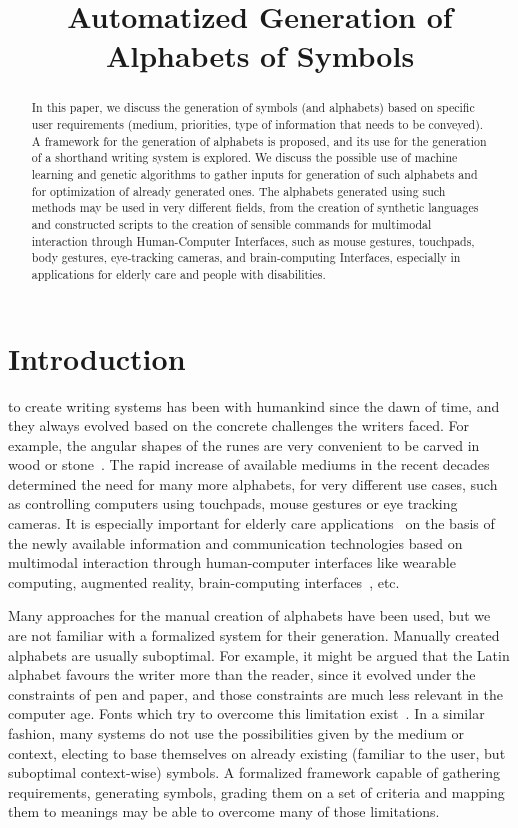 \documentclass[conference]{IEEEtran}
\title{Automatized Generation of Alphabets of Symbols}
\author{\IEEEauthorblockN{Serhii Hamotskyi\IEEEauthorrefmark{1}, Anis Rojbi\IEEEauthorrefmark{2}, Sergii Stirenko\IEEEauthorrefmark{1}, and Yuri Gordienko\IEEEauthorrefmark{1}}
\IEEEauthorblockA{\IEEEauthorrefmark{1}Igor Sikorsky Kyiv Polytechnic Institute, Kyiv, Ukraine, Email: shamotskyi@gmail.com}
\IEEEauthorblockA{\IEEEauthorrefmark{2}Laboratoire THIM (Technologies, Handicaps, Interfaces et Multimodalités), University Paris 8, Paris, France}
}
\begin{document}
\maketitle              %

\begin{abstract}
In this paper, we discuss the generation of symbols (and alphabets) based on specific user requirements (medium, priorities, type of information that needs to be conveyed). A framework for the generation of alphabets is proposed, and its use for the generation of a shorthand writing system is explored. We discuss the possible use of machine learning and genetic algorithms to gather inputs for generation of such alphabets and for optimization of already generated ones.
The alphabets generated using such methods may be used in very different fields, from the creation of synthetic languages and constructed scripts to the creation of sensible commands for multimodal interaction through Human-Computer Interfaces, such as mouse gestures, touchpads, body gestures, eye-tracking cameras, and brain-computing Interfaces, especially in applications for elderly care and people with disabilities. 
\end{abstract}

\section{Introduction}
%
\IEEEoverridecommandlockouts{} to create writing systems has been with humankind since the dawn of time, and they always evolved based on the concrete challenges the writers faced. For example, the angular shapes of the runes are very convenient to be carved in wood or stone~\cite{williams1996origin}. The rapid increase of available mediums in the recent decades determined the need for many more alphabets, for very different use cases, such as controlling computers using touchpads, mouse gestures or eye tracking cameras.  It is especially important for elderly care applications~\cite{gordienko2017augmented} on the basis of the newly available information and communication technologies based on multimodal interaction through human-computer interfaces like wearable computing, augmented reality, brain-computing interfaces~\cite{stirenko2017user}, etc. 

Many approaches for the manual creation of alphabets have been used, but we are not familiar with a formalized system for their generation. Manually created alphabets are usually suboptimal. For example, it might be argued that the Latin alphabet favours the writer more than the
reader, since it evolved under the constraints of pen and paper, and those constraints are much less relevant in the computer age. Fonts which try to overcome this limitation exist~\cite{dotsies}. In a similar fashion, many systems do not use the possibilities given by the medium or context, electing to base themselves on already existing (familiar to the user, but suboptimal context-wise) symbols. A formalized framework capable of gathering requirements, generating symbols, grading them on a set of criteria and mapping them to meanings may be able to overcome many of those limitations.
\end{document}
